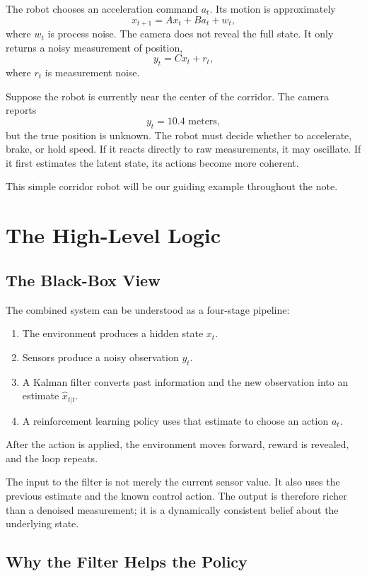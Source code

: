 \documentclass[12pt,a4paper]{article}
\begin{document}
The robot chooses an acceleration command \(a_t\). Its motion is approximately
\[
x_{t+1} = A x_t + B a_t + w_t,
\]
where \(w_t\) is process noise. The camera does not reveal the full state. It only returns a noisy measurement of position,
\[
y_t = C x_t + r_t,
\]
where \(r_t\) is measurement noise.

Suppose the robot is currently near the center of the corridor. The camera reports
\[
y_t = 10.4 \text{ meters},
\]
but the true position is unknown. The robot must decide whether to accelerate, brake, or hold speed. If it reacts directly to raw measurements, it may oscillate. If it first estimates the latent state, its actions become more coherent.

This simple corridor robot will be our guiding example throughout the note.

\section{The High-Level Logic}

\subsection{The Black-Box View}

The combined system can be understood as a four-stage pipeline:

\begin{enumerate}
  \item The environment produces a hidden state \(x_t\).
  \item Sensors produce a noisy observation \(y_t\).
  \item A Kalman filter converts past information and the new observation into an estimate \(\hat{x}_{t|t}\).
  \item A reinforcement learning policy uses that estimate to choose an action \(a_t\).
\end{enumerate}

After the action is applied, the environment moves forward, reward is revealed, and the loop repeats.

The input to the filter is not merely the current sensor value. It also uses the previous estimate and the known control action. The output is therefore richer than a denoised measurement; it is a dynamically consistent belief about the underlying state.

\subsection{Why the Filter Helps the Policy}
\end{document}
